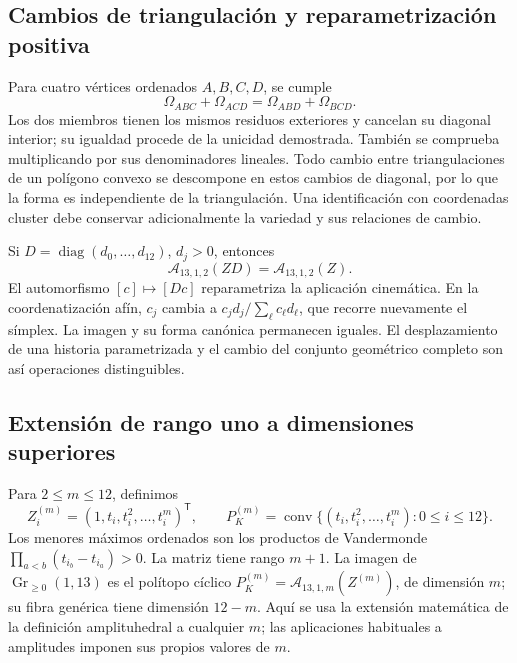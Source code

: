 \subsection{Cambios de triangulación y reparametrización positiva}

Para cuatro vértices ordenados \(A,B,C,D\), se cumple
\begin{equation}
 \Omega_{ABC}+\Omega_{ACD}=\Omega_{ABD}+\Omega_{BCD}.
 \label{eq:polygon-flip}
\end{equation}
Los dos miembros tienen los mismos residuos exteriores y cancelan su
diagonal interior; su igualdad procede de la unicidad demostrada.
También se comprueba multiplicando por sus denominadores lineales.
Todo cambio entre triangulaciones de un polígono convexo se descompone
en estos cambios de diagonal, por lo que la forma es independiente
de la triangulación. Una identificación con coordenadas cluster debe
conservar adicionalmente la variedad y sus relaciones de cambio.

Si \(D=\operatorname{diag}(d_0,\ldots,d_{12})\), \(d_j>0\), entonces
\begin{equation}
 \mathcal A_{13,1,2}(ZD)=\mathcal A_{13,1,2}(Z).
 \label{eq:polygon-rescale}
\end{equation}
El automorfismo \([c]\mapsto[Dc]\) reparametriza la aplicación cinemática.
En la coordenatización afín, \(c_j\) cambia a
\(c_jd_j/\sum_\ell c_\ell d_\ell\), que recorre nuevamente el símplex.
La imagen y su forma canónica permanecen iguales. El desplazamiento
de una historia parametrizada y el cambio del conjunto geométrico
completo son así operaciones distinguibles.

\subsection{Extensión de rango uno a dimensiones superiores}

Para \(2\leq m\leq12\), definimos
\begin{equation}
 Z_i^{(m)}=(1,t_i,t_i^2,\ldots,t_i^m)^\mathsf T,\qquad
 P_K^{(m)}=\operatorname{conv}
 \{(t_i,t_i^2,\ldots,t_i^m):0\leq i\leq12\}.
 \label{eq:polygon-higher-lift}
\end{equation}
Los menores máximos ordenados son los productos de Vandermonde
\(\prod_{a<b}(t_{i_b}-t_{i_a})>0\). La matriz tiene rango \(m+1\).
La imagen de \(\operatorname{Gr}_{\geq0}(1,13)\) es el polítopo cíclico
\(P_K^{(m)}=\mathcal A_{13,1,m}(Z^{(m)})\), de dimensión \(m\); su fibra
genérica tiene dimensión \(12-m\). Aquí se usa la extensión matemática
de la definición amplituhedral a cualquier \(m\); las aplicaciones
habituales a amplitudes imponen sus propios valores de \(m\).

